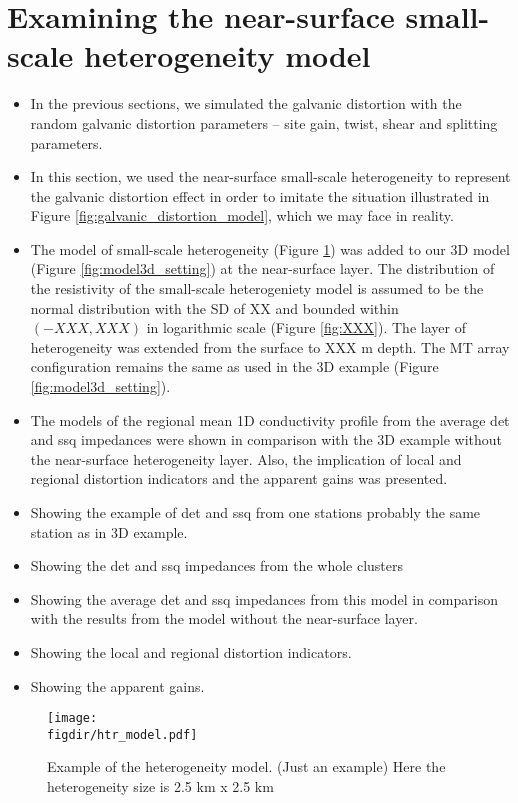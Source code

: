 
\renewcommand{\thisdir}{_content/htr_test}
\renewcommand{\figdir}{\thisdir/_fig}
\section{Examining the near-surface small-scale heterogeneity model}


\begin{itemize}
	\item In the previous sections, we simulated the galvanic distortion with the random galvanic distortion parameters -- site gain, twist, shear and splitting parameters.
	\item In this section, we used the near-surface small-scale heterogeneity to represent the galvanic distortion effect in order to imitate the situation illustrated in Figure \ref{fig:galvanic_distortion_model}, which we may face in reality.
	\item The model of small-scale heterogeneity (Figure \ref{fig:htr_model}) was added to our 3D model (Figure \ref{fig:model3d_setting}) at the near-surface layer.
	The distribution of the resistivity of the small-scale heterogeniety model is assumed to be the normal distribution with the SD of XX and bounded within $(-XXX,XXX)$ in logarithmic scale (Figure \ref{fig:XXX}). The layer of heterogeneity was extended from the surface to XXX m depth. The MT array configuration remains the same as used in the 3D example (Figure \ref{fig:model3d_setting}).
	\item The models of the regional mean 1D conductivity profile from the average det and ssq impedances were shown in comparison with the 3D example without the near-surface heterogeneity layer. Also, the implication of  local and regional distortion indicators and the apparent gains was presented.
\end{itemize}

\begin{itemize}
	\item Showing the example of det and ssq from one stations probably the same station as in 3D example.
	\item Showing the det and ssq impedances from the whole clusters
	\item Showing the average det and ssq impedances from this model in comparison with the results from the model without the near-surface layer.
	\item Showing the local and regional distortion indicators.
	\item Showing the apparent gains.
\end{itemize}

\begin{figure}
	\centering
	\texttt{[image: \\figdir/htr\_model.pdf]}
	\caption{Example of the heterogeneity model. (Just an example) Here the heterogeneity size is 2.5 km x 2.5 km}
	\label{fig:htr_model}	
\end{figure}

